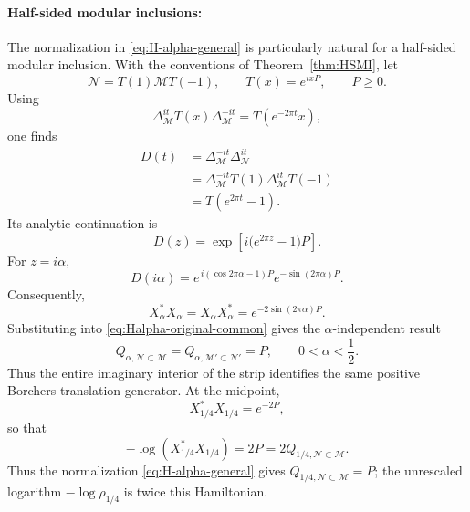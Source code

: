 \documentclass[a4paper,11pt]{article}
\theoremstyle{definition}
\newcommand{\mN}{\mathcal{N}}
\newcommand{\mM}{\mathcal{M}}
\begin{document}
\paragraph{Half-sided modular inclusions:} The normalization in \eqref{eq:H-alpha-general} is particularly natural for
a half-sided modular inclusion. With the conventions of
Theorem~\ref{thm:HSMI}, let
\begin{equation}
    \mN
    =
    T(1)\mM T(-1),
    \qquad
    T(x)=e^{ixP},
    \qquad
    P\geq0 .
\end{equation}
Using
\begin{equation}
    \Delta_{\mM}^{it}
    T(x)
    \Delta_{\mM}^{-it}
    =
    T(e^{-2\pi t}x),
\end{equation}
one finds
\begin{align}
    D(t)
    &=
    \Delta_{\mM}^{-it}\Delta_{\mN}^{it}
    \nonumber\\
    &=
    \Delta_{\mM}^{-it}
    T(1)\Delta_{\mM}^{it}T(-1)
    \nonumber\\
    &=
    T(e^{2\pi t}-1).
    \label{eq:D-HSMI-explicit}
\end{align}
Its analytic continuation is
\begin{equation}
    D(z)
    =
    \exp\left[
        i\bigl(e^{2\pi z}-1\bigr)P
    \right].
    \label{eq:D-HSMI-complex}
\end{equation}
For $z=i\alpha$,
\begin{equation}
    D(i\alpha)
    =
    e^{\,i(\cos 2\pi\alpha-1)P}
    e^{-\sin(2\pi\alpha)P}.
\end{equation}
Consequently,
\begin{equation}
    X_\alpha^*X_\alpha
    =
    X_\alpha X_\alpha^*
    =
    e^{-2\sin(2\pi\alpha)P}.
    \label{eq:rho-HSMI-alpha}
\end{equation}
Substituting into \eqref{eq:Halpha-original-common} gives the
$\alpha$-independent result
\begin{equation}
    \boxed{
    Q_{\alpha,\mN\subset\mM}
    =
    Q_{\alpha,\mM'\subset\mN'}
    =
    P,
    \qquad
    0<\alpha<\frac12 .
    }
    \label{eq:Halpha-HSMI-P}
\end{equation}
Thus the entire imaginary interior of the strip identifies the same positive
Borchers translation generator. At the midpoint,
\begin{equation}
    X_{1/4}^*X_{1/4}=e^{-2P},
\end{equation}
so that
\begin{equation}
    -\log(X_{1/4}^*X_{1/4})=2P=2Q_{1/4,\mN\subset\mM}.
\end{equation}
Thus the normalization \eqref{eq:H-alpha-general} gives
$Q_{1/4,\mN\subset\mM}=P$; the unrescaled logarithm $-\log\rho_{1/4}$ is twice
this Hamiltonian.
\end{document}
